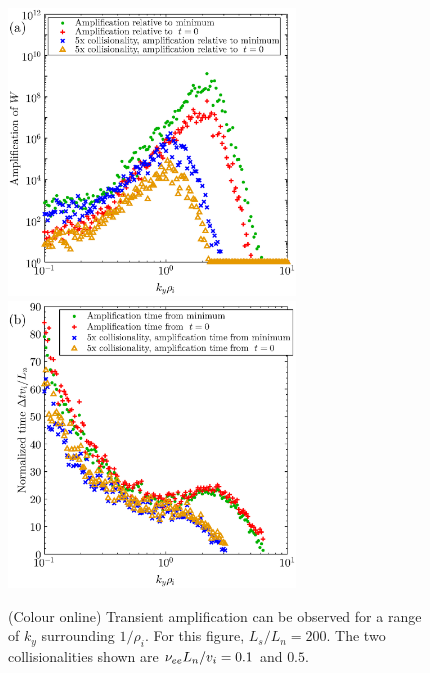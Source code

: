 \documentclass{jpp}
\begin{document}
\begin{figure}
\centerline{
\includegraphics[width=3in]{fig5a.eps}
\includegraphics[width=3in]{fig5b.eps}
}
\caption{(Colour online) Transient amplification can be observed
for a range of $k_y$ surrounding $1/\rho_i$.  For this figure, $L_s/L_n=200$.
The two collisionalities shown are $\nu_{ee} L_n / v_i = 0.1$ and $0.5$.
\label{fig:transientAmplificationVsKy}}
\end{figure}
\end{document}
